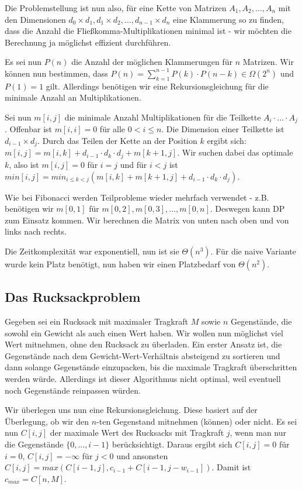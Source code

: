\documentclass[12pt]{article}
\begin{document}
Die Problemstellung ist nun also, für eine Kette von Matrizen $A_1, A_2, ..., A_n$ mit den Dimensionen $d_0 \times d_1, d_1 \times d_2, ..., d_{n-1} \times d_n$ eine Klammerung so zu finden, dass die Anzahl die Fließkomma-Multiplikationen minimal ist - wir möchten die Berechnung ja möglichst effizient durchführen.

Es sei nun $P(n)$ die Anzahl der möglichen Klammerungen für $n$ Matrizen. Wir können nun bestimmen, dass $P(n) = \sum_{k = 1}^{n - 1} P(k) \cdot P(n-k) \in \Omega(2^n)$ und $P(1) = 1$ gilt. Allerdings benötigen wir eine Rekursionsgleichung für die minimale Anzahl an Multiplikationen.

Sei nun $m[i,j]$ die minimale Anzahl Multiplikationen für die Teilkette $A_i \cdot ... \cdot A_j$. Offenbar ist $m[i,i] = 0$ für alle $0 < i \leq n$. Die Dimension einer Teilkette ist $d_{i-1} \times d_j$. Durch das Teilen der Kette an der Position $k$ ergibt sich: $m[i,j] = m[i,k] + d_{i-1} \cdot d_k \cdot d_j + m[k+1,j]$. Wir suchen dabei das optimale $k$, also ist $m[i,j] = 0$ für $i = j$ und für $i<j$ ist $min[i,j]=min_{i \leq k < j}(m[i,k]+m[k+1,j]+d_{i-1} \cdot d_k \cdot d_j)$.

Wie bei Fibonacci werden Teilprobleme wieder mehrfach verwendet - z.B. benötigen wir $m[0,1]$ für $m[0,2], m[0,3], ..., m[0,n]$. Deswegen kann DP zum Einsatz kommen. Wir berechnen die Matrix von unten nach oben und von links nach rechts.

Die Zeitkomplexität war exponentiell, nun ist sie $\Theta(n^3)$. Für die naive Variante wurde kein Platz benötigt, nun haben wir einen Platzbedarf von $\Theta(n^2)$.

\subsection{Das Rucksackproblem}

Gegeben sei ein Rucksack mit maximaler Tragkraft $M$ sowie $n$ Gegenstände, die sowohl ein Gewicht als auch einen Wert haben. Wir wollen nun möglichst viel Wert mitnehmen, ohne den Rucksack zu überladen. Ein erster Ansatz ist, die Gegenstände nach dem Gewicht-Wert-Verhältnis absteigend zu sortieren und dann solange Gegenstände einzupacken, bis die maximale Tragkraft überschritten werden würde. Allerdings ist dieser Algorithmus nicht optimal, weil eventuell noch Gegenstände reinpassen würden.

Wir überlegen uns nun eine Rekursionsgleichung. Diese basiert auf der Überlegung, ob wir den $n$-ten Gegenstand mitnehmen (können) oder nicht. Es sei nun $C[i,j]$ der maximale Wert des Rucksacks mit Tragkraft $j$, wenn man nur die Gegenstände $\{0, ..., i-1\}$ berücksichtigt. Daraus ergibt sich $C[i,j] = 0$ für $i = 0$, $C[i,j] = -\infty$ für $j < 0$ und ansonsten $C[i,j]=max(C[i-1,j], c_{i-1}+C[i-1, j-w_{i-1}])$. Damit ist $c_{max} = C[n,M]$.
\end{document}
